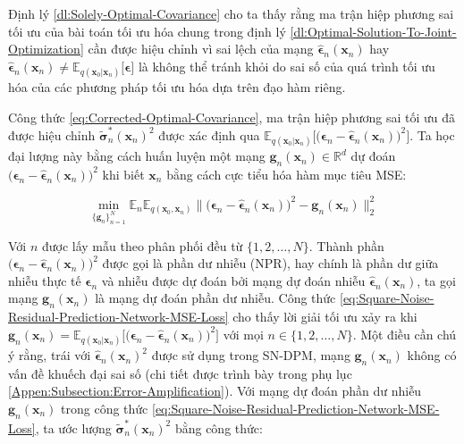 \documentclass[14pt, a4paper]{article}
\numberwithin{equation}{section}
\numberwithin{figure}{section}
\numberwithin{dl}{section}
\numberwithin{md}{section}
\numberwithin{bd}{section}
\numberwithin{dn}{section}
\numberwithin{hq}{section}
\begin{document}
    Định lý \ref{dl:Solely-Optimal-Covariance} cho ta thấy rằng ma trận hiệp phương sai tối ưu của bài toán tối ưu hóa chung trong định lý \ref{dl:Optimal-Solution-To-Joint-Optimization} cần được hiệu chỉnh vì sai lệch của mạng $\hat{\boldsymbol{\epsilon}}_n (\boldsymbol{x}_n)$ hay $\hat{\boldsymbol{\epsilon}}_n (\boldsymbol{x}_n) \neq \mathbb{E}_{q(\boldsymbol{x}_0 \vert \boldsymbol{x}_n)} \lbrack \boldsymbol{\epsilon} \rbrack$ là không thể tránh khỏi do sai số của quá trình tối ưu hóa của các phương pháp tối ưu hóa dựa trên đạo hàm riêng.

    Công thức \ref{eq:Corrected-Optimal-Covariance}, ma trận hiệp phương sai tối ưu đã được hiệu chỉnh $\tilde{\boldsymbol{\sigma}}_n^{\ast} (\boldsymbol{x}_n)^2$ được xác định qua $\mathbb{E}_{q(\boldsymbol{x}_0 \vert \boldsymbol{x}_n)} \Big\lbrack \big( \boldsymbol{\epsilon}_n - \hat{\boldsymbol{\epsilon}}_n (\boldsymbol{x}_n) \big)^2 \Big\rbrack$.
    Ta học đại lượng này bằng cách huấn luyện một mạng $\boldsymbol{g}_n (\boldsymbol{x}_n) \in \mathbb{R}^d$ dự đoán $\big( \boldsymbol{\epsilon}_n - \hat{\boldsymbol{\epsilon}}_n (\boldsymbol{x}_n) \big)^2$ khi biết $\boldsymbol{x}_n$ bằng cách cực tiểu hóa hàm mục tiêu MSE:

    \begin{equation} \label{eq:Square-Noise-Residual-Prediction-Network-MSE-Loss}
        \min_{\lbrace \boldsymbol{g}_n \rbrace_{n=1}^N} \mathbb{E}_n \mathbb{E}_{q(\boldsymbol{x}_0, \boldsymbol{x}_n)} \lVert \big( \boldsymbol{\epsilon}_n - \hat{\boldsymbol{\epsilon}}_n (\boldsymbol{x}_n) \big)^2 - \boldsymbol{g}_n (\boldsymbol{x}_n)  \rVert_2^2
    \end{equation}

    Với $n$ được lấy mẫu theo phân phối đều từ $\lbrace 1, 2, \dots, N \rbrace$.
    Thành phần $\big( \boldsymbol{\epsilon}_n - \hat{\boldsymbol{\epsilon}}_n (\boldsymbol{x}_n) \big)^2$ được gọi là phần dư nhiễu (NPR),
    hay chính là phần dư giữa nhiễu thực tế $\boldsymbol{\epsilon}_n$ và nhiễu được dự đoán bởi mạng dự đoán nhiễu $\hat{\boldsymbol{\epsilon}}_n (\boldsymbol{x}_n)$,
    ta gọi mạng $\boldsymbol{g}_n (\boldsymbol{x}_n)$ là mạng dự đoán phần dư nhiễu.
    Công thức \ref{eq:Square-Noise-Residual-Prediction-Network-MSE-Loss} cho thấy lời giải tối ưu xảy ra khi $\boldsymbol{g}_n (\boldsymbol{x}_n) = \mathbb{E}_{q(\boldsymbol{x}_0 \vert \boldsymbol{x}_n)} \Big\lbrack \big( \boldsymbol{\epsilon}_n - \hat{\boldsymbol{\epsilon}}_n (\boldsymbol{x}_n) \big)^2 \Big\rbrack$ với mọi $n \in \lbrace 1, 2, \dots, N \rbrace$.
    Một điều cần chú ý rằng, trái với $\hat{\boldsymbol{\epsilon}}_n (\boldsymbol{x}_n)^2$ được sử dụng trong SN-DPM,
    mạng $\boldsymbol{g}_n (\boldsymbol{x}_n)$ không có vấn đề khuếch đại sai số (chi tiết được trình bày trong phụ lục \ref{Appen:Subsection:Error-Amplification}).
    Với mạng dự đoán phần dư nhiễu $\boldsymbol{g}_n (\boldsymbol{x}_n)$ trong công thức \ref{eq:Square-Noise-Residual-Prediction-Network-MSE-Loss},
    ta ước lượng $\tilde{\boldsymbol{\sigma}}_n^{\ast} (\boldsymbol{x}_n)^2$ bằng công thức:
\end{document}
